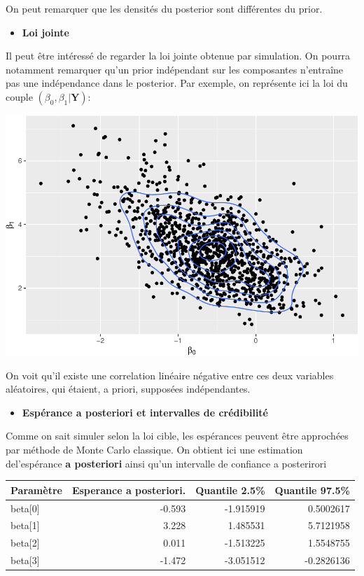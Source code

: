 \documentclass[]{article}
\providecommand{\tightlist}{%
  \setlength{\itemsep}{0pt}\setlength{\parskip}{0pt}}
\begin{document}
On peut remarquer que les densités du posterior sont différentes du
prior.

\begin{itemize}
\tightlist
\item
  \textbf{Loi jointe}
\end{itemize}

Il peut être intéressé de regarder la loi jointe obtenue par simulation.
On pourra notamment remarquer qu'un prior indépendant sur les
composantes n'entraîne pas une indépendance dans le posterior. Par
exemple, on représente ici la loi du couple
\((\beta_0,\beta_1 \vert \mathbf{Y})\):

\includegraphics{poly_cours_files/figure-latex/loi_jointe_beta0_beta1-1.pdf}

On voit qu'il existe une correlation linéaire négative entre ces deux
variables aléatoires, qui étaient, a priori, supposées indépendantes.

\begin{itemize}
\tightlist
\item
  \textbf{Espérance a posteriori et intervalles de crédibilité}
\end{itemize}

Comme on sait simuler selon la loi cible, les espérances peuvent être
approchées par méthode de Monte Carlo classique. On obtient ici une
estimation del'espérance \textbf{a posteriori} ainsi qu'un intervalle de
confiance a posterirori

\begin{longtable}[]{@{}lrrr@{}}
\toprule
Paramètre & Esperance a posteriori. & Quantile 2.5\% & Quantile
97.5\%\tabularnewline
\midrule
\endhead
beta{[}0{]} & -0.593 & -1.915919 & 0.5002617\tabularnewline
beta{[}1{]} & 3.228 & 1.485531 & 5.7121958\tabularnewline
beta{[}2{]} & 0.011 & -1.513225 & 1.5548755\tabularnewline
beta{[}3{]} & -1.472 & -3.051512 & -0.2826136\tabularnewline
\bottomrule
\end{longtable}
\end{document}
